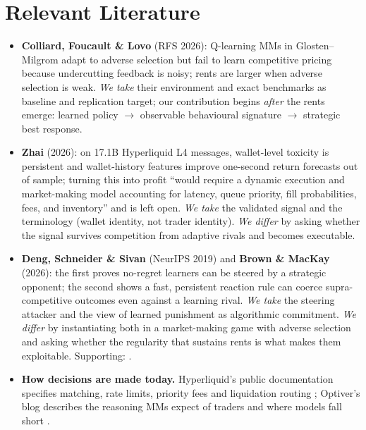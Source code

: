 \documentclass[11pt]{article}
\begin{document}
\section{Relevant Literature}
\begin{itemize}
\item \textbf{Colliard, Foucault \& Lovo} \cite{cfl} (RFS 2026): Q-learning MMs in Glosten--Milgrom adapt to adverse selection but fail to learn competitive pricing because undercutting feedback is noisy; rents are larger when adverse selection is weak. \emph{We take} their environment and exact benchmarks as baseline and replication target; our contribution begins \emph{after} the rents emerge: learned policy $\to$ observable behavioural signature $\to$ strategic best response.
\item \textbf{Zhai} \cite{zhai} (2026): on 17.1B Hyperliquid L4 messages, wallet-level toxicity is persistent and wallet-history features improve one-second return forecasts out of sample; turning this into profit ``would require a dynamic execution and market-making model accounting for latency, queue priority, fill probabilities, fees, and inventory'' and is left open. \emph{We take} the validated signal and the terminology (wallet identity, not trader identity). \emph{We differ} by asking whether the signal survives competition from adaptive rivals and becomes executable.
\item \textbf{Deng, Schneider \& Sivan} \cite{dss} (NeurIPS 2019) and \textbf{Brown \& MacKay} \cite{brownmackay} (2026): the first proves no-regret learners can be steered by a strategic opponent; the second shows a fast, persistent reaction rule can coerce supra-competitive outcomes even against a learning rival. \emph{We take} the steering attacker and the view of learned punishment as algorithmic commitment. \emph{We differ} by instantiating both in a market-making game with adverse selection and asking whether the regularity that sustains rents is what makes them exploitable. Supporting: \cite{contxiong,ccg,barone,brogaard,chilenje,dgj}.
\item \textbf{How decisions are made today.} Hyperliquid's public documentation specifies matching, rate limits, priority fees and liquidation routing \cite{hldocs}; Optiver's blog describes the reasoning MMs expect of traders and where models fall short \cite{optiver}.
\end{itemize}
\end{document}
